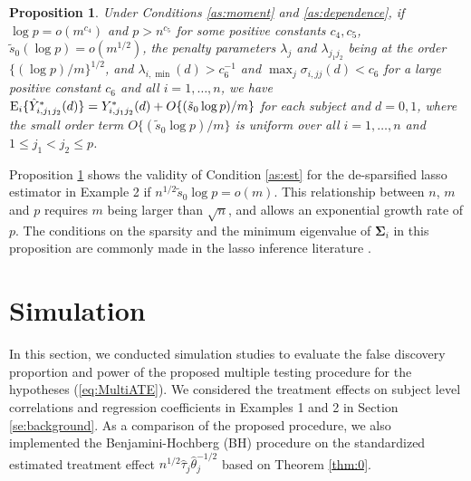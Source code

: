 \documentclass[12pt]{article}
\newtheorem{proposition}{Proposition}
\theoremstyle{definition}
\newcommand{\E}{\rm E}
\newcommand{\bY}{{\mathbf Y}}
\newcommand{\bSigma}{\boldsymbol{\Sigma}}
\newcommand{\btau}{\boldsymbol{\tau}}
\begin{document}
\begin{proposition}\label{pn:example2}
Under Conditions \ref{as:moment} and \ref{as:dependence}, 
if $\log p = o(m^{c_4})$ and $p > n^{c_5}$ for some positive constants $c_4, c_5$,
$\tilde{s}_0 (\log p) = o(m^{1/2})$, the penalty parameters $\lambda_j$ and $\lambda_{j_1j_2}$ being at the order $\{(\log p) / m\}^{1/2}$, and
$\lambda_{i, \min}(d) > c_6^{-1}$ and $\max_{j} \sigma_{i, jj}(d) < c_6$ for a large positive constant $c_6$ and all $i = 1, \ldots, n$,
we have
${\E}_{i}\{\hat{Y}_{i, j_1 j_2}^{\ast}(d)\} = Y^{\ast}_{i, j_1j_2}(d) + O\{ (\tilde{s}_0 \log p) / m\}$ for each subject and $d = 0, 1$, where the small order term $O\{ (\tilde{s}_0 \log p) / m\}$ is uniform over all $i = 1, \ldots, n$ and $1 \leq j_1 < j_2 \leq p$.
\end{proposition}

Proposition \ref{pn:example2} shows the validity of Condition \ref{as:est} for the de-sparsified lasso estimator in Example 2 if $n^{1/2} \tilde{s}_0 \log p = o(m)$. 
This relationship between $n$, $m$ and $p$ requires $m$ being larger than $\sqrt{n}$, and allows an exponential growth rate of $p$.
The conditions on the sparsity and the minimum eigenvalue of $\bSigma_i$ in this proposition are commonly made in the lasso inference literature \citep{vanderGeerRitov2014, Ning17}.
\fi


\setcounter{equation}{0}
\section{Simulation}\label{se:simulation}

In this section, we conducted simulation studies to evaluate the false discovery proportion and power of the proposed multiple testing procedure for the hypotheses (\ref{eq:MultiATE}). 
We considered the treatment effects on subject level correlations and regression coefficients in Examples 1 and 2 in Section \ref{se:background}. 
As a comparison of the proposed procedure, we also implemented the Benjamini-Hochberg (BH) procedure \citep{benjamini1995controlling} on the standardized estimated treatment effect $n^{1/2}\hat{\tau}_j\hat{\theta}_{j}^{-1/2}$ based on Theorem \ref{thm:0}.
\end{document}
